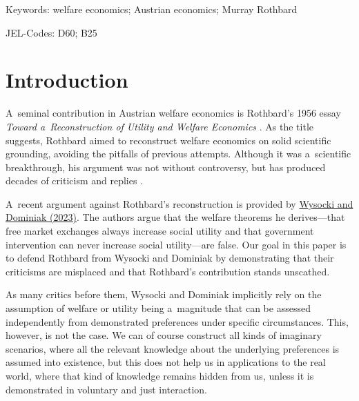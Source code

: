 Keywords: welfare economics; Austrian economics; Murray Rothbard



JEL-Codes: D60; B25



\section{Introduction}

A~seminal contribution in Austrian welfare economics is Rothbard's 1956 essay \textit{Toward a~Reconstruction of Utility and Welfare Economics} 
\parencite[][]{rothbard_toward_2011}. %
 As the title suggests, Rothbard aimed to reconstruct welfare economics on solid scientific grounding, avoiding the pitfalls of previous attempts. Although it was a~scientific breakthrough, his argument was not without controversy, but has produced decades of criticism and replies 
\parencites[][]{block_austrian_1999}[][]{caplan_austrian_1999}[][]{cordato_welfare_1992}[][]{gordon_toward_1993}[][]{herbener_pareto_1997}[][]{herbener_defense_2008}[][]{hulsmann_economic_1999}[][]{kvasnicka_rothbards_2008}[][]{prychitko_formalism_1993}.%




A~recent argument against Rothbard's reconstruction is provided by \href{https://www.zotero.org/google-docs/?CcG5f3}{Wysocki and}\href{https://www.zotero.org/google-docs/?CcG5f3}{ Dominiak }\label{ref:RNDvZAcMn6xM2}\href{https://www.zotero.org/google-docs/?CcG5f3}{(2023)}. The authors argue that the welfare theorems he derives---that free market exchanges always increase social utility and that government intervention can never increase social utility---are false. Our goal in this paper is to defend Rothbard from Wysocki and Dominiak 
\parencite*[][]{wysocki_how_2023} %
 by demonstrating that their criticisms are misplaced and that Rothbard's contribution stands unscathed.



As many critics before them, Wysocki and Dominiak implicitly rely on the assumption of welfare or utility being a~magnitude that can be assessed independently from demonstrated preferences under specific circumstances. This, however, is not the case. We can of course construct all kinds of imaginary scenarios, where all the relevant knowledge about the underlying preferences is assumed into existence, but this does not help us in applications to the real world, where that kind of knowledge remains hidden from us, unless it is demonstrated in voluntary and just interaction.



